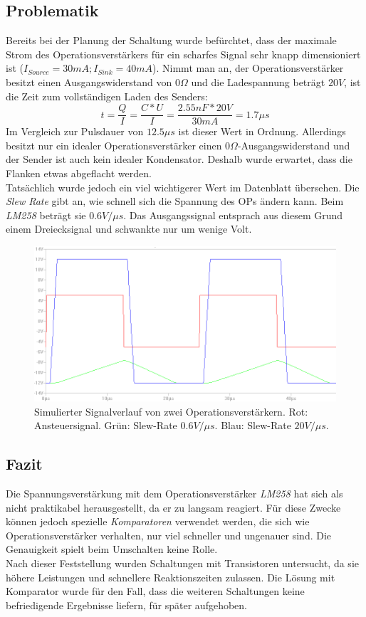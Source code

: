 \subsection{Problematik}
Bereits bei der Planung der Schaltung wurde befürchtet, dass der maximale Strom des Operationsverstärkers für ein scharfes Signal sehr knapp dimensioniert ist ($I_{Source}=30mA; I_{Sink}=40mA$). Nimmt man an, der Operationsverstärker besitzt einen Ausgangswiderstand von $0 \Omega$ und die Ladespannung beträgt $20V$, ist die Zeit zum vollständigen Laden des Senders:
\begin{equation}
t=\frac{Q}{I}=\frac{C*U}{I}=\frac{2.55nF*20V}{30mA}=1.7\mu s
\end{equation}
Im Vergleich zur Pulsdauer von $12.5\mu s$ ist dieser Wert in Ordnung. Allerdings besitzt nur ein idealer Operationsverstärker einen $0\Omega$-Ausgangswiderstand und der Sender ist auch kein idealer Kondensator. Deshalb wurde erwartet, dass die Flanken etwas abgeflacht werden.\\
Tatsächlich wurde jedoch ein viel wichtigerer Wert im Datenblatt übersehen. Die \textit{Slew Rate} gibt an, wie schnell sich die Spannung des OPs ändern kann. Beim \textit{LM258} beträgt sie $0.6V/\mu s$. Das Ausgangssignal entsprach aus diesem Grund einem Dreiecksignal und schwankte nur um wenige Volt.
\begin{figure}[H] %
\centering
\includegraphics[scale=0.6]{images/signalverlauf_opamps.png}
\caption{Simulierter Signalverlauf von zwei Operationsverstärkern. Rot: Ansteuersignal. Grün: Slew-Rate $0.6V/\mu s$. Blau: Slew-Rate $20V/\mu s$.} \label{img:I2}
\end{figure}

\subsection{Fazit}
Die Spannungsverstärkung mit dem Operationsverstärker \textit{LM258} hat sich als nicht praktikabel herausgestellt, da er zu langsam reagiert. Für diese Zwecke können jedoch spezielle \textit{Komparatoren} verwendet werden, die sich wie Operationsverstärker verhalten, nur viel schneller und ungenauer sind. Die Genauigkeit spielt beim Umschalten keine Rolle.\\
Nach dieser Feststellung wurden Schaltungen mit Transistoren untersucht, da sie höhere Leistungen und schnellere Reaktionszeiten zulassen. Die Lösung mit Komparator wurde für den Fall, dass die weiteren Schaltungen keine befriedigende Ergebnisse liefern, für später aufgehoben.


